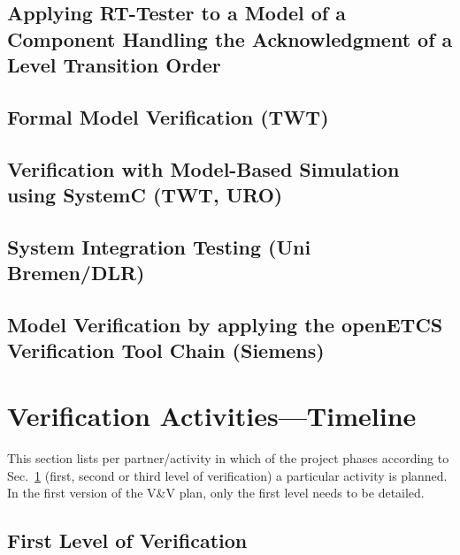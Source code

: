 

\subsection{Applying RT-Tester to a
  Model of a Component Handling the Acknowledgment  of a Level Transition Order }



\subsection{Formal Model Verification (TWT)}
\label{sec:real-time-TA-openETCS}




\subsection{Verification with Model-Based Simulation using SystemC (TWT, URO)}
\label{sec:model-based-sim-openETCS}



\subsection{System Integration  Testing (Uni Bremen/DLR)}



\subsection{Model Verification by applying the openETCS
  Verification Tool Chain (Siemens)}



\section{Verification Activities---Timeline}
\label{sec:verif-activ-timel}

This section lists per partner/activity in which of the project
phases according to Sec.~\ref{sec:verif-activ-timel} (first, second or
third level of verification) a particular activity is planned. In the
first version of the V\&V plan, only the first level needs to be detailed.


\subsection{First Level of Verification}
\label{sec:first-level-verif}

